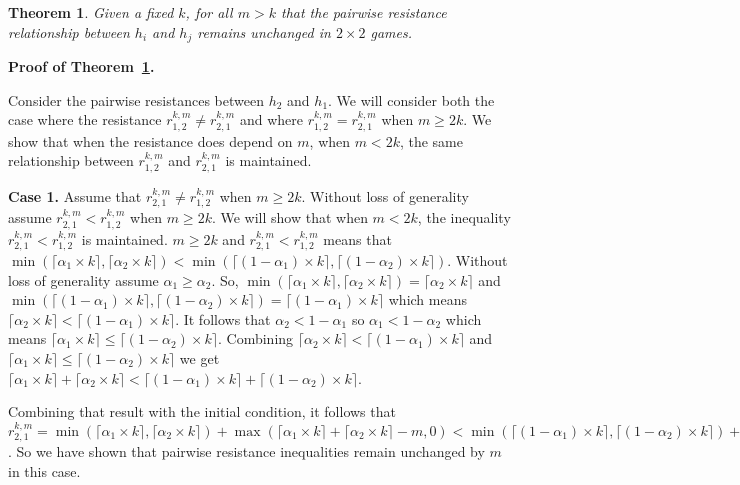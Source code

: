 \documentclass[11.5pt]{article}
\newtheorem{theorem}{Theorem}
\begin{document}
\begin{theorem}\label{Theorem_4}
Given a fixed $k$, for all $m > k$ that the pairwise resistance relationship between $h_i$ and $h_j$ remains unchanged in $2 \times 2$ games.
\end{theorem}


\textbf{Proof of Theorem~\ref{Theorem_4}.}


Consider the pairwise resistances between $h_2$ and $h_1$. We will consider both the case where the resistance $r_{1,2}^{k,m} \neq r_{2,1}^{k,m}$ and where $r_{1,2}^{k,m} = r_{2,1}^{k,m}$ when $m \geq 2k$. We show that when the resistance does depend on $m$, when $m<2k$, the same relationship between $r_{1,2}^{k,m}$ and $r_{2,1}^{k,m}$ is maintained.

{\bf Case 1.} Assume that $r^{k,m}_{2,1} \neq r^{k,m}_{1,2}$ when $m \geq 2k$. Without loss of generality assume $r^{k,m}_{2,1} < r^{k,m}_{1,2}$ when $m \geq 2k$. We will show that when $m < 2k$, the inequality $r^{k,m}_{2,1} < r^{k,m}_{1,2}$ is maintained. $m \geq 2k$ and $r^{k,m}_{2,1} < r^{k,m}_{1,2}$ means that $\min(\lceil \alpha_1 \times k \rceil,\lceil \alpha_2 \times k \rceil) < \min(\lceil (1-\alpha_1) \times k \rceil,\lceil (1-\alpha_2) \times k \rceil)$. Without loss of generality assume $\alpha_1 \geq \alpha_2$. So, $\min(\lceil \alpha_1 \times k \rceil,\lceil \alpha_2 \times k \rceil) = \lceil \alpha_2 \times k \rceil$ and $\min(\lceil (1-\alpha_1) \times k \rceil,\lceil (1-\alpha_2) \times k \rceil) = \lceil (1-\alpha_1) \times k \rceil$ which means $\lceil \alpha_2 \times k \rceil < \lceil (1-\alpha_1) \times k \rceil$. It follows that $\alpha_2< 1- \alpha_1$ so $\alpha_1< 1 - \alpha_2$ which means $\lceil \alpha_1 \times k \rceil \leq \lceil (1 - \alpha_2) \times k \rceil$. Combining $\lceil \alpha_2 \times k \rceil < \lceil (1-\alpha_1) \times k \rceil$ and  $\lceil \alpha_1 \times k \rceil \leq \lceil (1 - \alpha_2) \times k \rceil$ we get $\lceil \alpha_1 \times k \rceil+\lceil \alpha_2 \times k \rceil < \lceil (1-\alpha_1) \times k \rceil+\lceil (1-\alpha_2) \times k \rceil$.

Combining that result with the initial condition, it follows that $r^{k,m}_{2,1} = \min(\lceil \alpha_1 \times k \rceil,\lceil \alpha_2 \times k \rceil)+\max(\lceil \alpha_1 \times k \rceil+\lceil \alpha_2 \times k \rceil-m,0) < \min(\lceil (1-\alpha_1) \times k \rceil,\lceil (1-\alpha_2) \times k \rceil)+\max(\lceil (1-\alpha_1) \times k \rceil+\lceil (1-\alpha_2) \times k \rceil-m,0) = r^{k,m}_{1,2}$. So we have shown that pairwise resistance inequalities remain unchanged by $m$ in this case.
\end{document}
